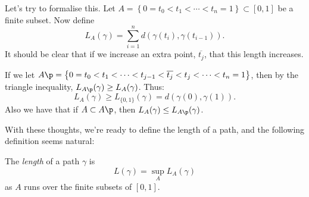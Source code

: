 Let's try to formalise this. Let $A = \left\{0 = t_0 < t_1 < \cdots < t_n = 1 \right\} \subset [0,1]$ be a finite subset. Now define
\begin{equation*}
	L_A(\gamma) = \sum_{i=1}^n d(\gamma(t_i), \gamma(t_{i-1})).
\end{equation*}
It should be clear that if we increase an extra point, $\overline{t_j}$, that this length increases.

\begin{center}
\end{center}

If we let $A\p = \left\{ 0 = t_0 < t_1 < \cdots < t_{j-1} < \overline{t_j} < t_j < \cdots < t_n = 1 \right\}$, then by the triangle inequality, $L_{A\p}(\gamma) \geq L_A(\gamma)$. Thus:
\begin{equation*}
	L_A(\gamma) \geq L_{\{0,1\}}(\gamma) = d(\gamma(0),\gamma(1)).
\end{equation*}
Also we have that if $A \subset A\p$, then $L_A(\gamma) \leq L_{A\p}(\gamma)$.

	\pagebreak

With these thoughts, we're ready to define the length of a path, and the following definition seems natural:

\begin{definition}
	The \emph{length} of a path $\gamma$ is
	\begin{equation*}
		L(\gamma) = \sup_A L_A(\gamma)
	\end{equation*}
	as $A$ runs over the finite subsets of $[0,1]$. %
\end{definition}

